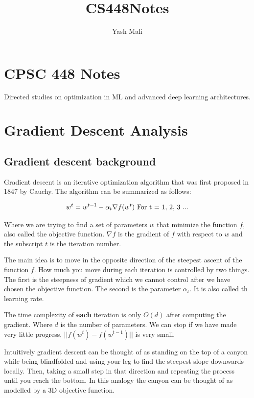 \documentclass[
]{article}
\title{CS448Notes}
\author{Yash Mali}
\date{}
\begin{document}
\maketitle

{
\setcounter{tocdepth}{2}
\tableofcontents
}
\section{CPSC 448 Notes}\label{cpsc-448-notes}

Directed studies on optimization in ML and advanced deep learning architectures.

\section{Gradient Descent Analysis}\label{gradient-descent-analysis}

\subsection{Gradient descent background}\label{gradient-descent-background}

Gradient descent is an iterative optimization algorithm that was first proposed in 1847 by Cauchy. The algorithm can be summarized as follows:

\[
w^t = w^{t-1} - \alpha_t \nabla f(w^t) \\
\text{  For t = 1, 2, 3 ...}
\]

Where we are trying to find a set of parameters \(w\) that minimize the function \(f\), also called the objective function. \(\nabla f\) is the gradient of \(f\) with respect to \(w\) and the subscript \(t\) is the iteration number.

The main idea is to move in the opposite direction of the steepest ascent of the function \(f\). How much you move during each iteration is controlled by two things. The first is the steepness of gradient which we cannot control after we have chosen the objective function. The second is the parameter \(\alpha_t\). It is also called th learning rate.

The time complexity of \textbf{each} iteration is only \(O(d)\) after computing the gradient. Where \(d\) is the number of parameters. We can stop if we have made very little progress, \(||f(w^t) - f(w^{t-1})||\) is very small.

Intuitively gradient descent can be thought of as standing on the top of a canyon while being blindfolded and using your leg to find the steepest slope downwards locally. Then, taking a small step in that direction and repeating the process until you reach the bottom. In this analogy the canyon can be thought of as modelled by a 3D objective function.
\end{document}
